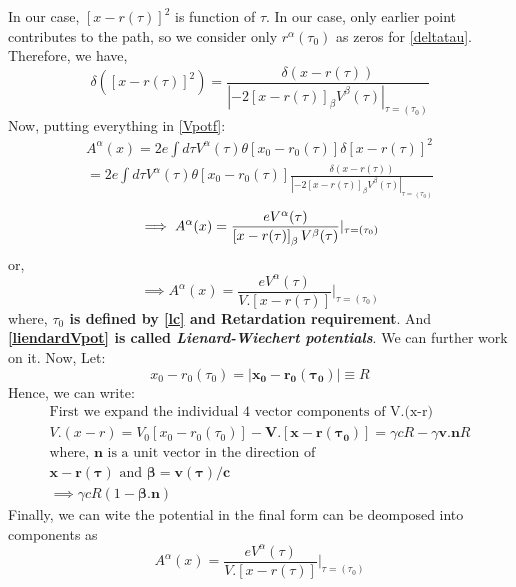 \documentclass[11pt]{report}
\newcommand{\mbf}[1]{\mathbf{#1}}
\newcommand{\tit}[1]{\textit{#1}}
\newcommand{\rr}[1]{\left[{#1}\right]}
\begin{document}
In our case, $\rr{x-r(\tau)}^2$ is function of $\tau$. In our case, only earlier point contributes to the path, so we consider only $r^\alpha(\tau_0)$ as zeros for \eqref{deltatau}.\\
Therefore, we have,
\begin{equation}\label{deltatau}
\delta([x-r(\tau)]^2)= \frac{\delta(x-r(\tau))}{|-2\rr{x-r(\tau)}_\beta V^\beta(\tau)|_{\tau=(\tau_0)}}
\end{equation}
Now, putting everything in \eqref{Vpotf}:
\begin{eqnarray*}
A^\alpha(x)=2e\int d\tau V^\alpha(\tau)\theta\rr{x_0-r_0(\tau)}\delta\rr{x-r(\tau)}^2\\
=2e\int d\tau V^\alpha(\tau)\theta\rr{x_0-r_0(\tau)}\frac{\delta(x-r(\tau))}{|-2\rr{x-r(\tau)}_\beta V^\beta(\tau)|_{\tau=(\tau_0)}}
\end{eqnarray*}
\begin{equation}
\implies A^\alpha(x)=\frac{e V^\alpha(\tau)}{\rr{x-r(\tau)}_\beta V^\beta(\tau)}|_{\tau=(\tau_0)}\\
\end{equation}
or,
\begin{equation}\label{liendardVpot}
\implies A^\alpha(x)=\frac{e V^\alpha(\tau)}{V . \rr{x-r(\tau)}}|_{\tau=(\tau_0)}
\end{equation}
where, \textbf{$\tau_0$ is defined by \eqref{lc} and Retardation requirement}. And \textbf{\eqref{liendardVpot} is called \tit{Lienard-Wiechert potentials}}.
We can further work on it. Now, Let:
\begin{equation}
x_0-r_0(\tau_0) = \mbf{|x_0-r_0(\tau_0)|} \equiv R
\end{equation}
Hence,
we can write:
\begin{eqnarray*}
\text{First we expand the individual 4 vector components of V.(x-r)}\\
V.(x-r)=V_0\rr{x_0-r_0(\tau_0)}-\mbf{V.\rr{x-r(\tau_0)}}
=\gamma cR-\gamma\mbf{v.n}R\\
\text{where, $\mbf{n}$ is a unit vector in the direction of}\\
\text{$\mbf{x-r(\tau)}$ and $\mbf{\beta=v(\tau)/c}$}\\
\implies \gamma c R(1-\mbf{\beta .n})
\end{eqnarray*}
Finally, we can wite the potential in the final form can be deomposed into components as
\begin{equation*}
 A^\alpha(x)=\frac{e V^\alpha(\tau)}{V . \rr{x-r(\tau)}}|_{\tau=(\tau_0)}
\end{equation*}
\end{document}
